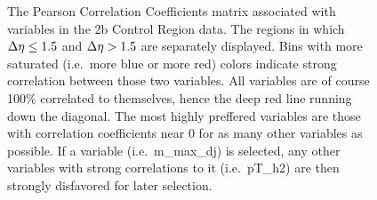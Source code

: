     \begin{figure}[!htbp]
        \caption{
            The Pearson Correlation Coefficients matrix associated with variables in the 2b Control Region data.
            The regions in which $\Delta \eta \leq 1.5$ and $\Delta \eta>1.5$ are separately displayed.
            Bins with more saturated (i.e.\ more blue or more red) colors indicate strong correlation between those two variables.
            All variables are of course 100\% correlated to themselves, hence the deep red line running down the diagonal.
            The most highly preffered variables are those with correlation coefficients near 0 for as many other variables as possible.
            If a variable (i.e.\ m\_max\_dj) is selected, any other variables with strong correlations to it (i.e.\ pT\_h2)
                are then strongly disfavored for later selection.
        }
        \label{fig:vbf_corr_matrix}
    \end{figure}


